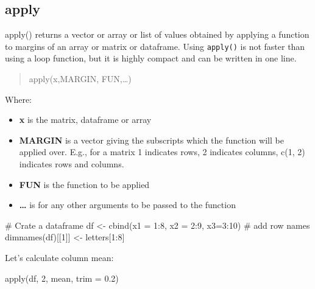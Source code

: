 \documentclass[
  letterpaper,
  DIV=11,
  numbers=noendperiod]{scrreprt}
\newenvironment{Shaded}{\begin{snugshade}}{\end{snugshade}}
\newcommand{\AttributeTok}[1]{\textcolor[rgb]{0.40,0.45,0.13}{#1}}
\newcommand{\CommentTok}[1]{\textcolor[rgb]{0.37,0.37,0.37}{#1}}
\newcommand{\DecValTok}[1]{\textcolor[rgb]{0.68,0.00,0.00}{#1}}
\newcommand{\FloatTok}[1]{\textcolor[rgb]{0.68,0.00,0.00}{#1}}
\newcommand{\FunctionTok}[1]{\textcolor[rgb]{0.28,0.35,0.67}{#1}}
\newcommand{\NormalTok}[1]{\textcolor[rgb]{0.00,0.23,0.31}{#1}}
\newcommand{\OtherTok}[1]{\textcolor[rgb]{0.00,0.23,0.31}{#1}}
\newcommand{\SpecialCharTok}[1]{\textcolor[rgb]{0.37,0.37,0.37}{#1}}
\begin{document}
\hypertarget{apply}{%
\subsection{apply}\label{apply}}

apply() returns a vector or array or list of values obtained by applying
a function to margins of an array or matrix or dataframe. Using
\texttt{apply()} is not faster than using a loop function, but it is
highly compact and can be written in one line.

\begin{quote}
apply(x,MARGIN, FUN,\ldots)
\end{quote}

Where:

\begin{itemize}
\item
  \textbf{x} is the matrix, dataframe or array
\item
  \textbf{MARGIN} is a vector giving the subscripts which the function
  will be applied over. E.g., for a matrix 1 indicates rows, 2 indicates
  columns, c(1, 2) indicates rows and columns.
\item
  \textbf{FUN} is the function to be applied
\item
  \textbf{\ldots{}} is for any other arguments to be passed to the
  function
\end{itemize}

\begin{Shaded}
\begin{Highlighting}[]
\CommentTok{\# Crate a dataframe}
\NormalTok{df }\OtherTok{\textless{}{-}} \FunctionTok{cbind}\NormalTok{(}\AttributeTok{x1 =} \DecValTok{1}\SpecialCharTok{:}\DecValTok{8}\NormalTok{, }\AttributeTok{x2 =} \DecValTok{2}\SpecialCharTok{:}\DecValTok{9}\NormalTok{, }\AttributeTok{x3=}\DecValTok{3}\SpecialCharTok{:}\DecValTok{10}\NormalTok{)}
\CommentTok{\# add row names}
\FunctionTok{dimnames}\NormalTok{(df)[[}\DecValTok{1}\NormalTok{]] }\OtherTok{\textless{}{-}}\NormalTok{ letters[}\DecValTok{1}\SpecialCharTok{:}\DecValTok{8}\NormalTok{] }
\end{Highlighting}
\end{Shaded}

Let's calculate column mean:

\begin{Shaded}
\begin{Highlighting}[]
\FunctionTok{apply}\NormalTok{(df, }\DecValTok{2}\NormalTok{, mean, }\AttributeTok{trim =} \FloatTok{0.2}\NormalTok{)}
\end{Highlighting}
\end{Shaded}
\end{document}
